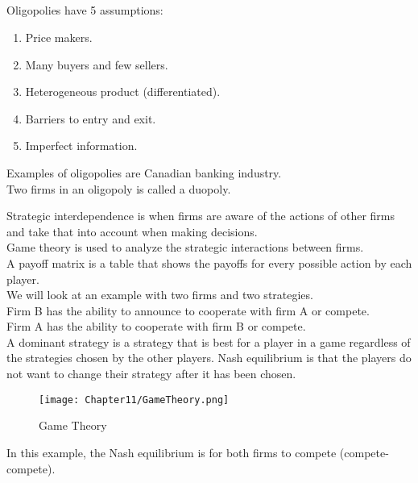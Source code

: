 \subsection{}
Oligopolies have 5 assumptions:
\begin{enumerate}
    \item Price makers.
    \item Many buyers and few sellers.
    \item Heterogeneous product (differentiated).
    \item Barriers to entry and exit.
    \item Imperfect information.
\end{enumerate}
Examples of oligopolies are Canadian banking industry.\\
Two firms in an oligopoly is called a duopoly.
\par
Strategic interdependence is when firms are aware of the actions of other firms and take that into account when making decisions.\\
Game theory is used to analyze the strategic interactions between firms.\\
A payoff matrix is a table that shows the payoffs for every possible action by each player.\\
We will look at an example with two firms and two strategies.\\
Firm B has the ability to announce to cooperate with firm A or compete.\\
Firm A has the ability to cooperate with firm B or compete.\\
A dominant strategy is a strategy that is best for a player in a game regardless of the strategies chosen by the other players.
Nash equilibrium is that the players do not want to change their strategy after it has been chosen.
\begin{figure}[H]
    \centering
    \texttt{[image: Chapter11/GameTheory.png]}
    \caption{Game Theory}
    \label{fig:gametheory}
\end{figure}
In this example, the Nash equilibrium is for both firms to compete (compete-compete).